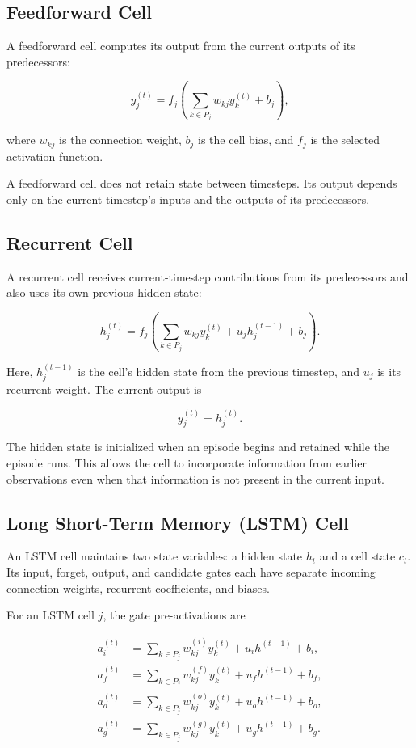 \documentclass[11pt]{article}
\begin{document}
\subsection{Feedforward Cell}

A feedforward cell computes its output from the current outputs of its
predecessors:

\[
    y_j^{(t)}
    =
    f_j\left(
        \sum_{k \in P_j} w_{kj} y_k^{(t)} + b_j
    \right),
\]

where \(w_{kj}\) is the connection weight, \(b_j\) is the cell bias,
and \(f_j\) is the selected activation function.

A feedforward cell does not retain state between timesteps. Its output
depends only on the current timestep's inputs and the outputs of its
predecessors.

\subsection{Recurrent Cell}

A recurrent cell receives current-timestep contributions from its
predecessors and also uses its own previous hidden state:

\[
    h_j^{(t)}
    =
    f_j\left(
        \sum_{k \in P_j} w_{kj} y_k^{(t)}
        + u_j h_j^{(t-1)}
        + b_j
    \right).
\]

Here, \(h_j^{(t-1)}\) is the cell's hidden state from the previous
timestep, and \(u_j\) is its recurrent weight. The current output is

\[
    y_j^{(t)} = h_j^{(t)}.
\]

The hidden state is initialized when an episode begins and retained
while the episode runs. This allows the cell to incorporate information
from earlier observations even when that information is not present in
the current input.

\subsection{Long Short-Term Memory (LSTM) Cell}

An LSTM cell maintains two state variables: a hidden state \(h_t\) and
a cell state \(c_t\). Its input, forget, output, and candidate gates
each have separate incoming connection weights, recurrent coefficients,
and biases.

For an LSTM cell \(j\), the gate pre-activations are

\[
\begin{aligned}
    a_i^{(t)}
    &=
    \sum_{k \in P_j} w_{kj}^{(i)} y_k^{(t)}
    + u_i h^{(t-1)} + b_i, \\
    a_f^{(t)}
    &=
    \sum_{k \in P_j} w_{kj}^{(f)} y_k^{(t)}
    + u_f h^{(t-1)} + b_f, \\
    a_o^{(t)}
    &=
    \sum_{k \in P_j} w_{kj}^{(o)} y_k^{(t)}
    + u_o h^{(t-1)} + b_o, \\
    a_g^{(t)}
    &=
    \sum_{k \in P_j} w_{kj}^{(g)} y_k^{(t)}
    + u_g h^{(t-1)} + b_g.
\end{aligned}
\]
\end{document}
